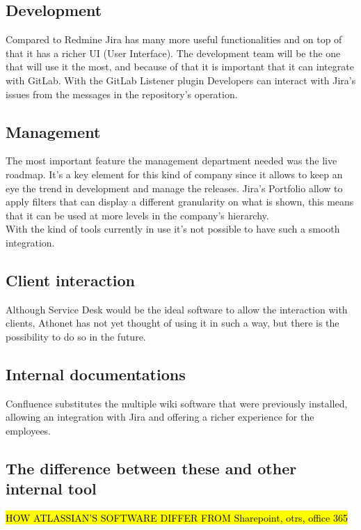 	\subsection{Development} 
		Compared to Redmine Jira has many more useful functionalities and on top of that it has a richer UI (User Interface).
		The development team will be the one that will use it the most, and because of that it is important that it can integrate with GitLab.
		With the GitLab Listener plugin\cite{gitlab-listener} Developers can interact with Jira's issues from the messages in the repository's operation.
	
	\subsection{Management} 
		The most important feature the management department needed was the live roadmap.	
		It's a key element for this kind of company since it allows to keep an eye the trend in development and manage the releases.
		Jira's Portfolio allow to apply filters that can display a different granularity on what is shown, this means that it can be used at more levels in the company's hierarchy.\\
		With the kind of tools currently in use it's not possible to have such a smooth integration.
	
	\subsection{Client interaction} 
		Although Service Desk would be the ideal software to allow the interaction with clients, Athonet has not yet thought of using it in such a way, but there is the possibility to do so in the future.
		
	\subsection{Internal documentations}
		Confluence substitutes the multiple wiki software that were previously installed, allowing an integration with Jira and offering a richer experience for the employees.
		
	\subsection{The difference between these and other internal tool}
		\hl{HOW ATLASSIAN'S SOFTWARE DIFFER FROM Sharepoint, otrs, office 365}

